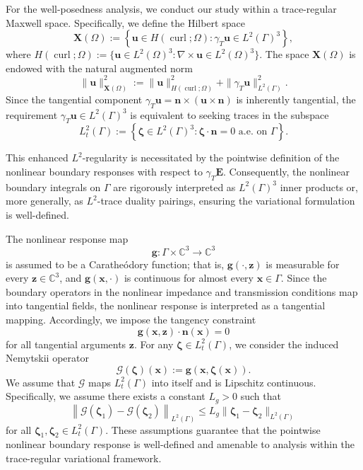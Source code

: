 \documentclass[10pt,a4paper]{amsart}
\numberwithin{equation}{section}
\begin{document}
For the well-posedness analysis, we conduct our study within a trace-regular Maxwell space. Specifically, we define the Hilbert space
\[
\mathbf{X}(\Omega) := \left\{ \mathbf{u} \in H(\operatorname{curl}; \Omega) : \gamma_T \mathbf{u} \in L^2(\Gamma)^3 \right\},
\]
where $H(\operatorname{curl}; \Omega) := \{ \mathbf{u} \in L^2(\Omega)^3 : \nabla \times \mathbf{u} \in L^2(\Omega)^3 \}$. The space $\mathbf{X}(\Omega)$ is endowed with the natural augmented norm
\[
\|\mathbf{u}\|_{\mathbf{X}(\Omega)}^2 := \|\mathbf{u}\|_{H(\operatorname{curl}; \Omega)}^2 + \|\gamma_T \mathbf{u}\|_{L^2(\Gamma)}^2.
\]
Since the tangential component $\gamma_T \mathbf{u} = \mathbf{n} \times (\mathbf{u} \times \mathbf{n})$ is inherently tangential, the requirement $\gamma_T \mathbf{u} \in L^2(\Gamma)^3$ is equivalent to seeking traces in the subspace 
\[
L_t^2(\Gamma) := \left\{ \boldsymbol{\zeta} \in L^2(\Gamma)^3 : \boldsymbol{\zeta} \cdot \mathbf{n} = 0 \text{ a.e. on } \Gamma \right\}.
\]

This enhanced $L^2$-regularity is necessitated by the pointwise definition of the nonlinear boundary responses with respect to $\gamma_T \mathbf{E}$. Consequently, the nonlinear boundary integrals on $\Gamma$ are rigorously interpreted as $L^2(\Gamma)^3$ inner products or, more generally, as $L^2$-trace duality pairings, ensuring the variational formulation is well-defined.


The nonlinear response map
\[
\mathbf{g} \colon \Gamma \times \mathbb{C}^3 \to \mathbb{C}^3
\]
is assumed to be a Carathe\'odory function; that is, $\mathbf{g}(\cdot, \boldsymbol{z})$ is measurable for every $\boldsymbol{z} \in \mathbb{C}^3$, and $\mathbf{g}(\boldsymbol{x}, \cdot)$ is continuous for almost every $\boldsymbol{x} \in \Gamma$. Since the boundary operators in the nonlinear impedance and transmission conditions map into tangential fields, the nonlinear response is interpreted as a tangential mapping. Accordingly, we impose the tangency constraint
\[
\mathbf{g}(\boldsymbol{x}, \boldsymbol{z}) \cdot \mathbf{n}(\boldsymbol{x}) = 0
\]
for all tangential arguments $\boldsymbol{z}$. For any $\boldsymbol{\zeta} \in L_t^2(\Gamma)$, we consider the induced Nemytskii operator
\[
\mathcal{G}(\boldsymbol{\zeta})(\boldsymbol{x}) := \mathbf{g}(\boldsymbol{x}, \boldsymbol{\zeta}(\boldsymbol{x})).
\]
We assume that $\mathcal{G}$ maps $L_t^2(\Gamma)$ into itself and is Lipschitz continuous. Specifically, we assume there exists a constant $L_g > 0$ such that
\begin{equation}
\label{eq:g_lipschitz_L2}
\left\| \mathcal{G}(\boldsymbol{\zeta}_1) - \mathcal{G}(\boldsymbol{\zeta}_2) \right\|_{L^2(\Gamma)} \le L_g \|\boldsymbol{\zeta}_1 - \boldsymbol{\zeta}_2\|_{L^2(\Gamma)}
\end{equation}
for all $\boldsymbol{\zeta}_1, \boldsymbol{\zeta}_2 \in L_t^2(\Gamma)$. These assumptions guarantee that the pointwise nonlinear boundary response is well-defined and amenable to analysis within the trace-regular variational framework.
\end{document}
